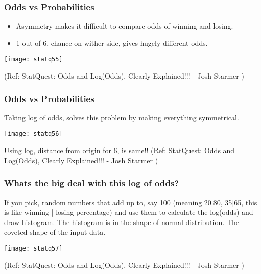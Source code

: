 \begin{frame}[fragile]\frametitle{Odds vs Probabilities}



\begin{itemize}
\item Asymmetry makes it difficult to compare odds of winning and losing.
\item 1 out of 6, chance on wither side, gives hugely different odds.
\end{itemize}

\begin{center}
\texttt{[image: statq55]}
\end{center}


\tiny{(Ref: StatQuest: Odds and Log(Odds), Clearly Explained!!! - Josh Starmer )}
\end{frame}


\begin{frame}[fragile]\frametitle{Odds vs Probabilities}

Taking log of odds, solves this problem by making everything symmetrical.


\begin{center}
\texttt{[image: statq56]}
\end{center}

Using log, distance from origin  for 6, is same!!
\tiny{(Ref: StatQuest: Odds and Log(Odds), Clearly Explained!!! - Josh Starmer )}
\end{frame}

\begin{frame}[fragile]\frametitle{Whats the big deal with this log of odds?}

If you pick, random numbers that add up to, say 100 (meaning 20|80, 35|65, this is like winning | losing percentage) and use them to calculate the log(odds) and draw histogram. The histogram is in the shape of normal distribution. The coveted shape of the input data.

\begin{center}
\texttt{[image: statq57]}
\end{center}


\tiny{(Ref: StatQuest: Odds and Log(Odds), Clearly Explained!!! - Josh Starmer )}
\end{frame}

